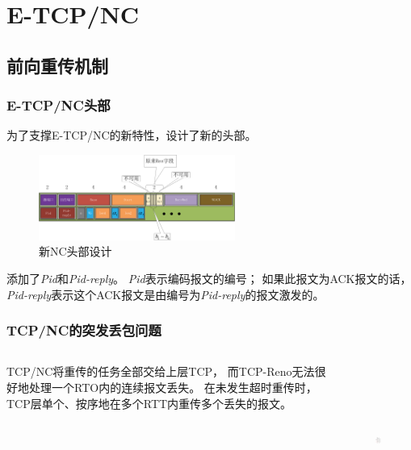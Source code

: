 \section{E-TCP/NC}
\subsection{前向重传机制}
\begin{frame}
	\frametitle{E-TCP/NC头部}
	为了支撑E-TCP/NC的新特性，设计了新的头部。
	\begin{figure}
		\hspace{-1.5em}
		\includegraphics[height=2.8cm]{figures/newheader.eps}
		\caption{新NC头部设计}
		\label{fig:ncheader}
	\end{figure}
	添加了\emph{Pid}和\emph{Pid-reply}。
	\emph{Pid}表示编码报文的编号；
	如果此报文为ACK报文的话，
	\emph{Pid-reply}表示这个ACK报文是由编号为\emph{Pid-reply}的报文激发的。
\end{frame}
\begin{frame}
	\frametitle{TCP/NC的突发丢包问题}
	\begin{columns}
		\begin{column}{0.5\textwidth}
			TCP/NC将重传的任务全部交给上层TCP，
			而TCP-Reno无法很好地处理一个RTO内的连续报文丢失。
			在未发生超时重传时，TCP层单个、按序地在多个RTT内重传多个丢失的报文。
		\end{column}
		\begin{column}{0.5\textwidth}
			\begin{figure}
				\includegraphics[height=5cm]{../figures/fr.eps}
				\label{原有TCP/NC的重传机制}
			\end{figure}
		\end{column}
	\end{columns}
\end{frame}

